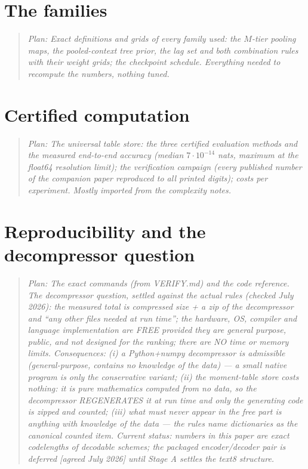 \documentclass[11pt]{article}
\newcommand{\planned}[1]{\begin{quote}\small\itshape Plan: #1\end{quote}}
\begin{document}
\section{The families}
\planned{Exact definitions and grids of every family used: the
$M$-tier pooling maps, the pooled-context tree prior, the lag set and
both combination rules with their weight grids; the checkpoint
schedule.  Everything needed to recompute the numbers, nothing
tuned.}

\section{Certified computation}
\planned{The universal table store: the three certified evaluation
methods and the measured end-to-end accuracy (median $7\cdot10^{-14}$
nats, maximum at the float64 resolution limit); the verification
campaign (every published number of the companion paper reproduced to
all printed digits); costs per experiment.  Mostly imported from the
complexity notes.}

\section{Reproducibility and the decompressor question}
\planned{The exact commands (from VERIFY.md) and the code reference.
The decompressor question, settled against the actual rules (checked
July 2026): the measured total is compressed size + a zip of the
decompressor and ``any other files needed at run time''; the
hardware, OS, compiler and language implementation are FREE provided
they are general purpose, public, and not designed for the ranking;
there are NO time or memory limits.  Consequences: (i) a
Python+numpy decompressor is admissible (general-purpose, contains
no knowledge of the data) --- a small native program is only the
conservative variant; (ii) the moment-table store costs nothing:
it is pure mathematics computed from no data, so the decompressor
REGENERATES it at run time and only the generating code is zipped
and counted; (iii) what must never appear in the free part is
anything with knowledge of the data --- the rules name dictionaries
as the canonical counted item.  Current status: numbers in this
paper are exact codelengths of decodable schemes; the packaged
encoder/decoder pair is deferred [agreed July 2026] until Stage A
settles the text8 structure.}
\end{document}

